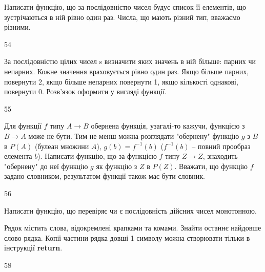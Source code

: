 Написати функцію, що за послідовністю чисел будує список її елементів, що зустрічаються в ній рівно один раз. Числа, що мають різний тип, вважаємо різними.
\\\par
54 














За послідовністю цілих чисел s визначити яких значень в ній більше: парних чи непарних. Кожне значення враховується рівно один раз. Якщо більше парних, повернути 2, якщо більше непарних повернути 1, якщо кількості однакові, повернути 0. Розв’язок оформити у вигляді функції.
\\\par
55 














Для функції $f$ типу $A\rightarrow B$ обернена функція, узагалі-то кажучи, функцією з $B\rightarrow A$ може не бути. Тим не менш можна розглядати "обернену" функцію $g$ з $B$ в $P(A)$ (булеан множини $A$), $g\left(b\right)=f^{-1}\left(b\right)$ ($f^{-1}\left(b\right)$ -- повний прообраз елемента $b$). Написати функцію, що за функцією $f$  типу $Z\rightarrow Z$, знаходить "обернену" до неї функцію $g$ як функцію з $Z$ в $P(Z)$. Вважати, що функцію $f$ задано словником, результатом функції також має бути словник.
\\\par
56 














Написати функцію, що перевіряє чи є послідовність дійсних чисел монотонною.
\\\par
{} 














Рядок містить слова, відокремлені крапками та комами. Знайти останнє найдовше слово рядка. Копії частини рядка довші 1 символу можна створювати тільки в інструкції \textbf{return}.
\\\par
58 














